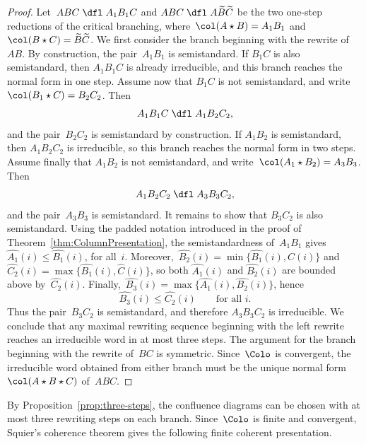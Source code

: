 \documentclass[a4paper, twoside, 11pt, english]{article}
\begin{document}
\begin{proof}
Let~$ABC \;\dfl\; A_1B_1C$ and $ABC \;\dfl\; A\widetilde B\widetilde C$ be the two one-step reductions of the critical branching, where~$\col(A\star B)=A_1B_1$ and~$\col(B\star C)=\widetilde B\widetilde C$.
We first consider the branch beginning with the rewrite of~$AB$.
By construction, the pair~$A_1B_1$ is semistandard.
If $B_1C$ is also semistandard, then $A_1B_1C$ is already irreducible, and this branch reaches the normal form in one step.
Assume now that $B_1C$ is not semistandard, and write~$\col(B_1\star C)=B_2C_2$.
Then
\[
A_1B_1C \;\dfl\; A_1B_2C_2,
\]
and the pair~$B_2C_2$ is semistandard by construction.
If $A_1B_2$ is semistandard, then $A_1B_2C_2$ is irreducible, so this branch reaches the normal form in two steps.
Assume finally that $A_1B_2$ is not semistandard, and write~$\col(A_1\star B_2)=A_3B_3$.
Then
\[
A_1B_2C_2 \;\dfl\; A_3B_3C_2,
\]
and the pair~$A_3B_3$ is semistandard.
It remains to show that $B_3C_2$ is also semistandard.
Using the padded notation introduced in the proof of Theorem~\ref{thm:ColumnPresentation}, the semistandardness of~$A_1B_1$ gives~$\widehat{A_1}(i)\le \widehat{B_1}(i)$, for all~$i$.
Moreover,~$\widehat{B_2}(i)=\min\{\widehat{B_1}(i),\widehat{C}(i)\}$ and~$\widehat{C_2}(i)=\max\{\widehat{B_1}(i),\widehat{C}(i)\}$, 
so both $\widehat{A_1}(i)$ and $\widehat{B_2}(i)$ are bounded above by~$\widehat{C_2}(i)$.
Finally,~$\widehat{B_3}(i)=\max\{\widehat{A_1}(i),\widehat{B_2}(i)\}$,
hence
\[
\widehat{B_3}(i)\le \widehat{C_2}(i)
\qquad\text{for all } i.
\]
Thus the pair~$B_3C_2$ is semistandard, and therefore $A_3B_3C_2$ is irreducible.
We conclude that any maximal rewriting sequence beginning with the left rewrite reaches an irreducible word in at most three steps.
The argument for the branch beginning with the rewrite of~$BC$ is symmetric.
Since~$\Colo$ is convergent, the irreducible word obtained from either branch must be the unique normal form~$\col(A\star B\star C)$ of~$ABC$.
\end{proof}


By Proposition~\ref{prop:three-steps}, the confluence diagrams
can be chosen with at most three rewriting steps on each branch.
Since~$\Colo$ is finite and convergent, Squier's coherence theorem
gives the following finite coherent presentation.
\end{document}
